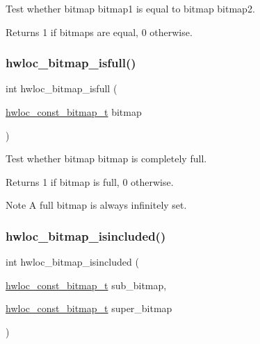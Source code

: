 Test whether bitmap {\ttfamily bitmap1} is equal to bitmap {\ttfamily bitmap2}. 

\begin{DoxyReturn}{Returns}
1 if bitmaps are equal, 0 otherwise. 
\end{DoxyReturn}
\mbox{\label{a00205_ga5fdcb8c19c336511c37076d649e74af4}} 
\subsubsection{\texorpdfstring{hwloc\+\_\+bitmap\+\_\+isfull()}{hwloc\_bitmap\_isfull()}}
{\footnotesize\ttfamily int hwloc\+\_\+bitmap\+\_\+isfull (\begin{DoxyParamCaption}\item[{\hyperlink{a00205_gae991a108af01d408be2776c5b2c467b2}{hwloc\+\_\+const\+\_\+bitmap\+\_\+t}}]{bitmap }\end{DoxyParamCaption})}



Test whether bitmap {\ttfamily bitmap} is completely full. 

\begin{DoxyReturn}{Returns}
1 if bitmap is full, 0 otherwise.
\end{DoxyReturn}
\begin{DoxyNote}{Note}
A full bitmap is always infinitely set. 
\end{DoxyNote}
\mbox{\label{a00205_ga0526e03db81956fb02acc8260b66d6a4}} 
\subsubsection{\texorpdfstring{hwloc\+\_\+bitmap\+\_\+isincluded()}{hwloc\_bitmap\_isincluded()}}
{\footnotesize\ttfamily int hwloc\+\_\+bitmap\+\_\+isincluded (\begin{DoxyParamCaption}\item[{\hyperlink{a00205_gae991a108af01d408be2776c5b2c467b2}{hwloc\+\_\+const\+\_\+bitmap\+\_\+t}}]{sub\+\_\+bitmap,  }\item[{\hyperlink{a00205_gae991a108af01d408be2776c5b2c467b2}{hwloc\+\_\+const\+\_\+bitmap\+\_\+t}}]{super\+\_\+bitmap }\end{DoxyParamCaption})}



